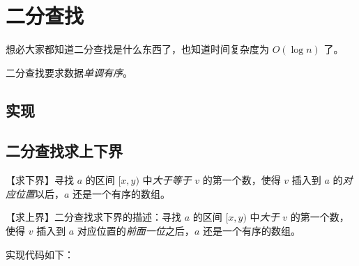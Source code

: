 \section{二分查找}
	想必大家都知道二分查找是什么东西了，也知道时间复杂度为 $O(\log n)$ 了。
	
	二分查找要求数据\emph{单调有序}。

    \subsection{实现}
	    
	    
	\subsection{二分查找求上下界}
		【求下界】寻找 $a$ 的区间 $[x,y)$ 中\emph{大于等于} $v$ 的第一个数，使得 $v$ 插入到 $a$ 的\emph{对应位置}以后，$a$ 还是一个有序的数组。
		
		【求上界】二分查找求下界的描述：寻找 $a$ 的区间 $[x,y)$ 中\emph{大于} $v$ 的第一个数，使得 $v$ 插入到 $a$ 对应位置的\emph{前面一位}之后，$a$ 还是一个有序的数组。
		
		实现代码如下：
		
		
    
    
    

